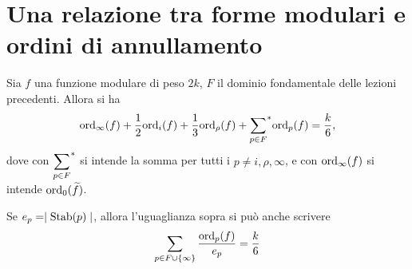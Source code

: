 
\section{Una relazione tra forme modulari e ordini di annullamento}

\begin{teorema} \label{170201-forme-ordini}
	Sia $f$ una funzione modulare di peso $2k$, $F$ il dominio fondamentale delle lezioni precedenti. Allora si ha
	\begin{equation*}
	\text{ord}_\infty(f)+\frac{1}{2}\text{ord}_i(f)+\frac{1}{3}\text{ord}_{\rho}(f)+{\sum_{p\in F}}^{*}\text{ord}_p(f)=\frac{k}{6},
	\end{equation*}
	dove con $\displaystyle{\sum_{p\in F}}^{*}$ si intende la somma per tutti i $p \neq i, \rho, \infty$, e con $\text{ord}_\infty(f)$ si intende $\text{ord}_0(\widetilde{f})$.

	Se $e_p=\mid \text{Stab}(p) \mid$, allora l'uguaglianza sopra si può anche scrivere
	\begin{equation*}
		\sum_{p\in F \cup \{\infty\}} \frac{\text{ord}_p(f)}{e_p}=\frac{k}{6}
	\end{equation*}
\end{teorema}

